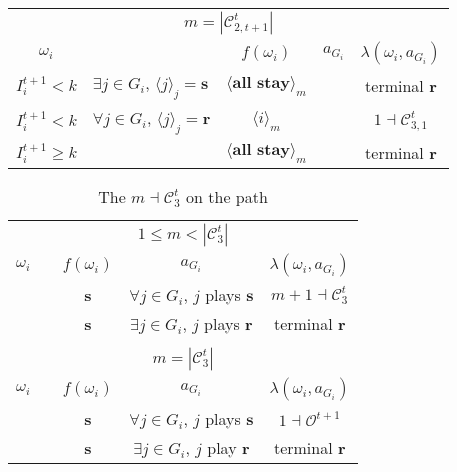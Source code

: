 \documentclass[12pt,letter]{article}
\newcommand{\Kappa}{\mathcal{C}}
\newcommand{\Omicron}{\mathcal{O}}
\theoremstyle{definition}
\theoremstyle{remark}
\theoremstyle{claim}
\begin{document}
\begin{table}[!htbp]
\begin{center}
\begin{tabular}{c l | c | c | c}
\\
\multicolumn{5}{c}{$m= |\Kappa^t_{2,t+1}|$}\\
$\omega_i$ 	 & 	   &	$f(\omega_i)$  &	$a_{G_i}$ & $\lambda(\omega_i,a_{G_i})$ \\
\hline
\hline
$I^{t+1}_i< k$  	& 	$\exists j\in G_i$, $\langle j \rangle_j=\textbf{s}$	& $\langle \textbf{all stay} \rangle_m$		&  	& terminal \textbf{r}\\
$I^{t+1}_i< k$  	& 	$\forall j\in G_i$, $\langle j \rangle_j=\textbf{r}$	& $\langle i \rangle_m$		&  	& $1\dashv \Kappa^t_{3,1}$\\
$I^{t+1}_i\geq k$	 & 				& $\langle \textbf{all stay} \rangle_m$ 	& 		& terminal \textbf{r}\\
\hline
\end{tabular}
\end{center}
\end{table}




\clearpage









\begin{table}[!htbp]
\caption{The $m\dashv\Kappa^t_{3}$ on the path}
\label{table:eqm_path_kt3}
\begin{center}
\begin{tabular}{c c | c | c | c}
\multicolumn{5}{c}{$1\leq m < |\Kappa^t_3|$}\\
$\omega_i$ 	 & 	   &	$f(\omega_i)$  &	$a_{G_i}$ & $\lambda(\omega_i,a_{G_i})$ \\
\hline
\hline
  	&	& \textbf{s} & $\forall j\in G_i$, $j$ plays $\textbf{s}$ 	& $m+1\dashv \Kappa^t_{3}$\\
  	&  & \textbf{s}  &  $\exists j\in G_i$, $j$ plays $\textbf{r}$  	& terminal \textbf{r}\\
\hline
\\
\multicolumn{5}{c}{$m= |\Kappa^t_3|$}\\
$\omega_i$ 	 & 	   &	$f(\omega_i)$  &	$a_{G_i}$ & $\lambda(\omega_i,a_{G_i})$ \\
\hline
\hline
 	& 	& \textbf{s} & $\forall j\in G_i$, $j$ plays $\textbf{s}$ 	& $1\dashv \Omicron^{t+1}$\\
  	&  & \textbf{s}  &  $\exists j\in G_i$, $j$ play $\textbf{r}$  	& terminal \textbf{r}\\
\hline
\end{tabular}
\end{center}
\end{table}
\end{document}
